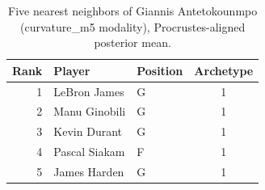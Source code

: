 \begin{table}[htbp]
  \centering\small
  \begin{tabular}{rllc}
    \toprule
    Rank & Player & Position & Archetype \\
    \midrule
    1 & LeBron James & G & 1 \\
    2 & Manu Ginobili & G & 1 \\
    3 & Kevin Durant & G & 1 \\
    4 & Pascal Siakam & F & 1 \\
    5 & James Harden & G & 1 \\
    \bottomrule
  \end{tabular}
  \caption{Five nearest neighbors of Giannis Antetokounmpo (curvature_m5 modality), Procrustes-aligned posterior mean.}
  \label{tab:Giannis_Antetokounmpo_neighbors_curvature_m5}
\end{table}

